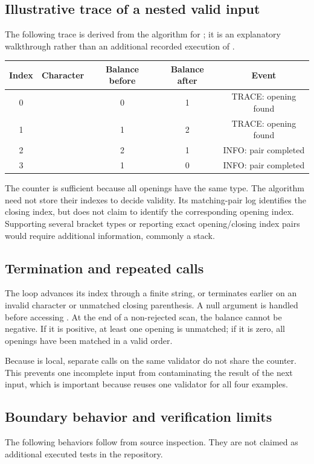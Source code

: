 \subsection{Illustrative trace of a nested valid input}
The following trace is derived from the algorithm for \code{(())}; it is an explanatory walkthrough rather than an additional recorded execution of .

\begin{center}\small
\begin{tabular}{@{}ccccc@{}}
\toprule
\textbf{Index} & \textbf{Character} & \textbf{Balance before} & \textbf{Balance after} & \textbf{Event}\\
\midrule
0 & \code{(} & 0 & 1 & TRACE: opening found\\
1 & \code{(} & 1 & 2 & TRACE: opening found\\
2 & \code{)} & 2 & 1 & INFO: pair completed\\
3 & \code{)} & 1 & 0 & INFO: pair completed\\
\bottomrule
\end{tabular}
\end{center}
The counter is sufficient because all openings have the same type. The algorithm need not store their indexes to decide validity. Its matching-pair log identifies the closing index, but does not claim to identify the corresponding opening index. Supporting several bracket types or reporting exact opening/closing index pairs would require additional information, commonly a stack.

\subsection{Termination and repeated calls}
The loop advances its index through a finite string, or terminates earlier on an invalid character or unmatched closing parenthesis. A null argument is handled before accessing . At the end of a non-rejected scan, the balance cannot be negative. If it is positive, at least one opening is unmatched; if it is zero, all openings have been matched in a valid order.

Because  is local, separate calls on the same validator do not share the counter. This prevents one incomplete input from contaminating the result of the next input, which is important because  reuses one validator for all four examples.

\subsection{Boundary behavior and verification limits}
The following behaviors follow from source inspection. They are not claimed as additional executed tests in the repository.

